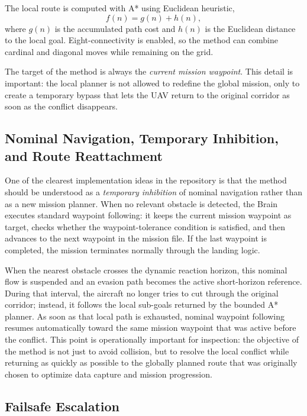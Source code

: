 \documentclass[a4paper,11pt]{article}
\begin{document}
The local route is computed with A* \cite{hart1968formal} using Euclidean heuristic,
\begin{equation}
    f(n) = g(n) + h(n),
\end{equation}
where \(g(n)\) is the accumulated path cost and \(h(n)\) is the Euclidean distance to the local goal. Eight-connectivity is enabled, so the method can combine cardinal and diagonal moves while remaining on the grid.

The target of the method is always the \emph{current mission waypoint}. This detail is important: the local planner is not allowed to redefine the global mission, only to create a temporary bypass that lets the UAV return to the original corridor as soon as the conflict disappears.

\subsection{Nominal Navigation, Temporary Inhibition, and Route Reattachment}

One of the clearest implementation ideas in the repository is that the method should be understood as a \emph{temporary inhibition} of nominal navigation rather than as a new mission planner. When no relevant obstacle is detected, the Brain executes standard waypoint following: it keeps the current mission waypoint as target, checks whether the waypoint-tolerance condition is satisfied, and then advances to the next waypoint in the mission file. If the last waypoint is completed, the mission terminates normally through the landing logic.

When the nearest obstacle crosses the dynamic reaction horizon, this nominal flow is suspended and an evasion path becomes the active short-horizon reference. During that interval, the aircraft no longer tries to cut through the original corridor; instead, it follows the local sub-goals returned by the bounded A* planner. As soon as that local path is exhausted, nominal waypoint following resumes automatically toward the same mission waypoint that was active before the conflict. This point is operationally important for inspection: the objective of the method is not just to avoid collision, but to resolve the local conflict while returning as quickly as possible to the globally planned route that was originally chosen to optimize data capture and mission progression.

\subsection{Failsafe Escalation}
\end{document}
